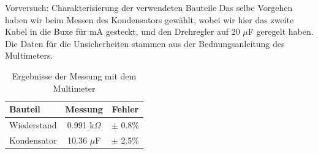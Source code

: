 \documentclass[twoside]{protokoll}
\begin{document}
\begin{aufgabe}{Vorversuch: Charakterisierung der verwendeten Bauteile}
Das selbe Vorgehen haben wir beim Messen des Kondensators gewählt, wobei wir hier das zweite Kabel in die Buxe für mA gesteckt, und den Drehregler auf 20 $\mu$F geregelt haben. \\

Die Daten für die Unsicherheiten stammen aus der Bednungsanleitung des Multimeters.\\
\begin{table}[H]
        \centering
        \begin{tabularx}{0.8\textwidth}{X c c} %
            \toprule
            \textbf{Bauteil} & \textbf{Messung} & \textbf{Fehler} \\
            \midrule
            Wiederstand & 0.991 k$\Omega$ & $\pm$ 0.8\% \\
            Kondensator & 10.36 $\mu$F & $\pm$ 2.5\%  \\
            \bottomrule
        \end{tabularx}
        \caption{Ergebnisse der Messung mit dem Multimeter}
        \label{tab:mytable}
    \end{table}
\end{aufgabe}
\end{document}
